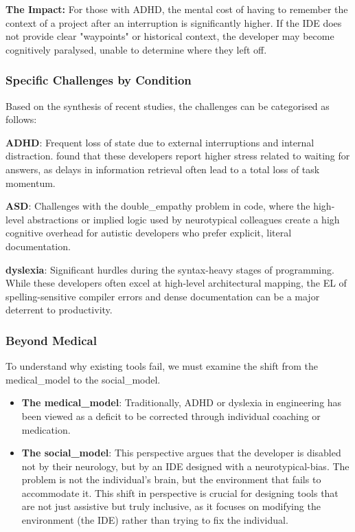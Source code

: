 \textbf{The Impact:} For those with \gls{ADHD}, the mental cost of having to remember the context of a project after an interruption is significantly higher. If the \gls{IDE} does not provide clear "waypoints" or historical context, the developer may become cognitively paralysed, unable to determine where they left off.

\subsubsection{Specific Challenges by Condition}

Based on the synthesis of recent studies, the challenges can be categorised as follows:

\textbf{\gls{ADHD}}: Frequent loss of state due to external interruptions and internal distraction.\textcite{verma2025differences} found that these developers report higher stress related to waiting for answers, as delays in information retrieval often lead to a total loss of task momentum.

\textbf{\gls{ASD}}: Challenges with the \Gls{double_empathy} problem in code, where the high-level abstractions or implied logic used by neurotypical colleagues create a high cognitive overhead for autistic developers who prefer explicit, literal documentation.

\textbf{\Gls{dyslexia}}: Significant hurdles during the syntax-heavy stages of programming. While these developers often excel at high-level architectural mapping, the \gls{EL} of spelling-sensitive compiler errors and dense documentation can be a major deterrent to productivity.

\subsubsection{Beyond Medical}

To understand why existing tools fail, we  must examine the shift from the \Gls{medical_model} to the \Gls{social_model}.

\begin{itemize}
    \item \textbf{The \Gls{medical_model}}: Traditionally, \gls{ADHD} or \gls{dyslexia} in engineering has been viewed as a deficit to be corrected through individual coaching or medication.
    \item \textbf{The \Gls{social_model}}: This perspective argues that the developer is disabled not by their neurology, but by an \gls{IDE} designed with a \gls{neurotypical-bias}. The problem is not the individual's
     brain, but the environment that fails to accommodate it. This shift in perspective is crucial for designing tools that are not just assistive but truly inclusive, as it focuses on modifying the
      environment (the \gls{IDE}) rather than trying to fix the individual.
\end{itemize}

